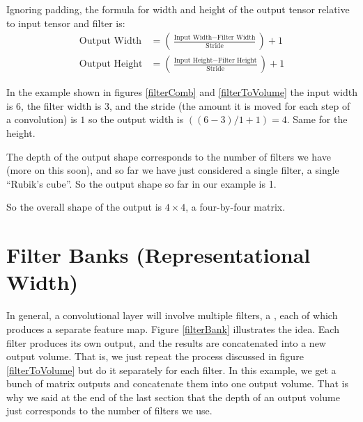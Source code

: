 Ignoring padding, the formula for width and height of the output tensor relative to input tensor and filter is:
\begin{align*}
\text{Output Width} &= \left( \frac{\text{Input Width} - \text{Filter Width}}{\text{Stride}} \right) + 1 \\
\text{Output Height} &= \left(  \frac{\text{Input Height} - \text{Filter Height}}{\text{Stride}} \right) + 1
\end{align*}

In the example shown in figures \ref{filterComb} and \ref{filterToVolume} the input width is $6$, the filter width is $3$, and the stride (the amount it is moved for each step of a convolution) is $1$ so the output width is $((6-3)/1 + 1) = 4$. Same for the height. 

The depth of the output shape corresponds to the number of filters we have (more on this soon), and so far we have just considered a single filter, a single ``Rubik's cube''. So the output shape so far in our example is 1. 

So the overall shape of the output is $4 \times 4$, a four-by-four matrix.

\section{Filter Banks (Representational Width)}


In general, a convolutional layer will involve multiple filters, a , each of which produces a separate feature map.  Figure \ref{filterBank} illustrates the idea. Each filter produces its own output, and the results are concatenated into a new output volume. That is, we just repeat the process discussed in figure \ref{filterToVolume} but do it separately for each filter. In this example, we get a bunch of matrix outputs and concatenate them into one output volume. That is why we said at the end of the last section that the depth of an output volume just corresponds to the number of filters we use. 

